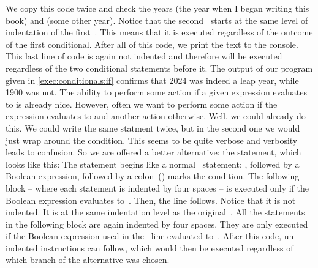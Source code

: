 We copy this code twice and check the years  (the year when I began writing this book) and  (some other year).
Notice that the second~ starts at the same level of indentation of the first~.
This means that it is executed regardless of the outcome of the first conditional.
After all of this code, we print the text  to the console.
This last line of code is again not indented and therefore will be executed regardless of the two conditional statements before it.
The output of our program given in \cref{exec:conditionals:if} confirms that 2024 was indeed a leap year, while 1900 was not.%
%
\FloatBarrier%
\endhsection%
%
%
%
%
The ability to perform some action if a given expression evaluates to  is already nice.
However, often we want to perform some action if the expression evaluates to  and another action otherwise.
Well, we could already do this.
We could write the same  statment twice, but in the second one we would just wrap  around the condition.
This seems to be quite verbose and verbosity leads to confusion.
So we are offered a better alternative: the  statement, which looks like this:%
%
%
%
\FloatBarrier%
%
%
%
%
%
%
%
The statement begins like a normal ~statement:
, followed by a Boolean expression, followed by a colon~(\pythonilIdx{:}) marks the condition.
The following block -- where each statement is indented by four spaces -- is executed only if the Boolean expression evaluates to~.
Then, the  line follows.
Notice that it is not indented.
It is at the same indentation level as the original~.
All the statements in the following block are again indented by four spaces.
They are only executed if the Boolean expression used in the ~line evaluated to~.
After this code, un-indented instructions can follow, which would then be executed regardless of which branch of the alternative was chosen.

